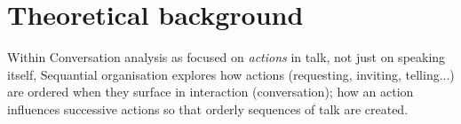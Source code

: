 \documentclass[11pt]{article}
\begin{document}
\section{Theoretical background}{
	Within Conversation analysis as focused on \textit{actions} in talk, not just on speaking itself,
	Sequantial organisation explores how actions (requesting, inviting, telling...) are ordered when they surface in interaction (conversation); how an action influences successive actions so that orderly sequences of talk are created.
    
}
\end{document}
